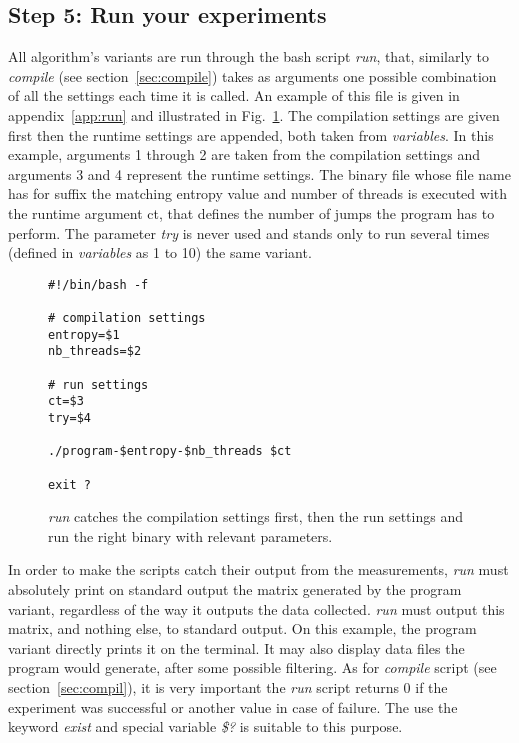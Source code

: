 \subsection{Step 5: Run your experiments}
\label{sec:run}
All algorithm's variants are run through the bash script \emph{run}, that, similarly to \emph{compile} (see section~\ref{sec:compile}) takes as arguments one possible combination of all the settings each time it is called. An example of this file is given in appendix~\ref{app:run} and illustrated in Fig.~\ref{fig:run}. The compilation settings are given first then the runtime settings are appended, both taken from \emph{variables}. In this example, arguments 1 through 2 are taken from the compilation settings and arguments 3 and 4 represent the runtime settings. The binary file whose file name has for suffix the matching entropy value and number of threads is executed with the runtime argument ct, that defines the number of jumps the program has to perform. The parameter \emph{try} is never used and stands only to run several times (defined in \emph{variables} as 1 to 10) the same variant.

\begin{figure}
\centering
\begin{lstlisting}
#!/bin/bash -f

# compilation settings
entropy=$1
nb_threads=$2

# run settings
ct=$3
try=$4

./program-$entropy-$nb_threads $ct

exit ?
\end{lstlisting}
\caption{\emph{run} catches the compilation settings first, then the run settings and run the right binary with relevant parameters.}
\label{fig:run}
\end{figure}

In order to make the scripts catch their output from the measurements, \emph{run} must absolutely print on standard output the matrix generated by the program variant, regardless of the way it outputs the data collected. \emph{run} must output this matrix, and nothing else, to standard output. On this example, the program variant directly prints it on the terminal. It may also display data files the program would generate, after some possible filtering. As for \emph{compile} script (see section~\ref{sec:compil}), it is very important the \emph{run} script returns 0 if the experiment was successful or another value in case of failure. The use the keyword \emph{exist} and special variable \emph{\$?} is suitable to this purpose.

